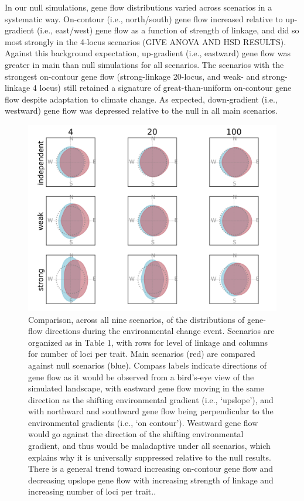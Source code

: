 \documentclass[9pt,twocolumn,twoside,lineno]{pnas-new}
\begin{document}
In our null simulations, gene flow distributions varied across scenarios in a systematic way. On-contour (i.e., north/south) gene flow increased relative to up-gradient (i.e., east/west) gene flow as a function of strength of linkage, and did so most strongly in the 4-locus scenarios (GIVE ANOVA AND HSD RESULTS). Against this background expectation, up-gradient (i.e., eastward) gene flow was greater in main than null simulations for all scenarios.  The scenarios with the strongest on-contour gene flow (strong-linkage 20-locus, and weak- and strong-linkage 4 locus) still retained a signature of great-than-uniform on-contour gene flow despite adaptation to climate change. As expected, down-gradient (i.e., westward) gene flow was depressed relative to the null in all main scenarios.


\begin{figure}
\centering
\includegraphics[width=17.8cm]{gene_flow.jpg}
\caption{Comparison, across all nine scenarios, of the distributions of gene-flow directions during the environmental change event. Scenarios are organized as in Table 1, with rows for level of linkage and columns for number of loci per trait. Main scenarios (red) are compared against null scenarios (blue). Compass labels indicate directions of gene flow as it would be observed from a bird’s-eye view of the simulated landscape, with eastward gene flow moving in the same direction as the shifting environmental gradient (i.e., ‘upslope’), and with northward and southward gene flow being perpendicular to the environmental gradients (i.e., ‘on contour’). Westward gene flow would go against the direction of the shifting environmental gradient, and thus would be maladaptive under all scenarios, which explains why it is universally suppressed relative to the null results. There is a general trend toward increasing on-contour gene flow and decreasing upslope gene flow with increasing strength of linkage and increasing number of loci per trait..
}
\label{fig:gene_flow}
\end{figure}
\end{document}
